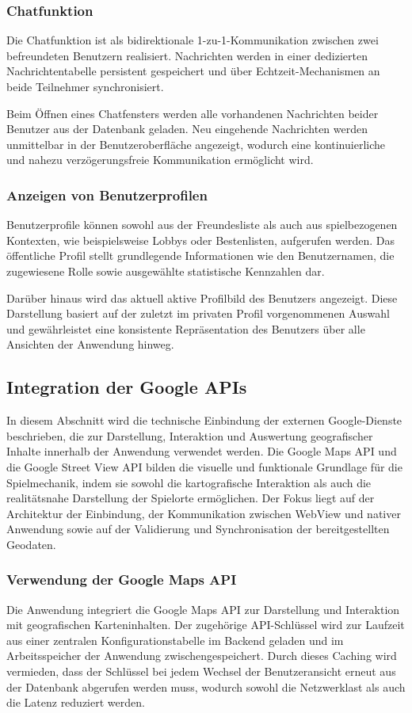 \subsubsection{Chatfunktion}
Die Chatfunktion ist als bidirektionale 1-zu-1-Kommunikation zwischen zwei befreundeten Benutzern realisiert. 
Nachrichten werden in einer dedizierten Nachrichtentabelle persistent gespeichert und über Echtzeit-Mechanismen an beide Teilnehmer synchronisiert.

Beim Öffnen eines Chatfensters werden alle vorhandenen Nachrichten beider Benutzer aus der Datenbank geladen. 
Neu eingehende Nachrichten werden unmittelbar in der Benutzeroberfläche angezeigt, wodurch eine kontinuierliche und nahezu verzögerungsfreie Kommunikation ermöglicht wird.

\subsubsection{Anzeigen von Benutzerprofilen}
Benutzerprofile können sowohl aus der Freundesliste als auch aus spielbezogenen Kontexten, wie beispielsweise Lobbys oder Bestenlisten, aufgerufen werden. 
Das öffentliche Profil stellt grundlegende Informationen wie den Benutzernamen, die zugewiesene Rolle sowie ausgewählte statistische Kennzahlen dar.

Darüber hinaus wird das aktuell aktive Profilbild des Benutzers angezeigt. 
Diese Darstellung basiert auf der zuletzt im privaten Profil vorgenommenen Auswahl und gewährleistet eine konsistente Repräsentation des Benutzers über alle Ansichten der Anwendung hinweg.

\subsection{Integration der Google APIs}
In diesem Abschnitt wird die technische Einbindung der externen Google-Dienste beschrieben, die zur Darstellung, Interaktion und Auswertung geografischer Inhalte innerhalb der Anwendung verwendet werden. 
Die Google Maps API und die Google Street View API bilden die visuelle und funktionale Grundlage für die Spielmechanik, indem sie sowohl die kartografische Interaktion als auch die realitätsnahe Darstellung der Spielorte ermöglichen. 
Der Fokus liegt auf der Architektur der Einbindung, der Kommunikation zwischen WebView und nativer Anwendung sowie auf der Validierung und Synchronisation der bereitgestellten Geodaten.

\subsubsection{Verwendung der Google Maps API}
Die Anwendung integriert die Google Maps API zur Darstellung und Interaktion mit geografischen Karteninhalten. 
Der zugehörige API-Schlüssel wird zur Laufzeit aus einer zentralen Konfigurationstabelle im Backend geladen und im Arbeitsspeicher der Anwendung zwischengespeichert. 
Durch dieses Caching wird vermieden, dass der Schlüssel bei jedem Wechsel der Benutzeransicht erneut aus der Datenbank abgerufen werden muss, wodurch sowohl die Netzwerklast als auch die Latenz reduziert werden.

